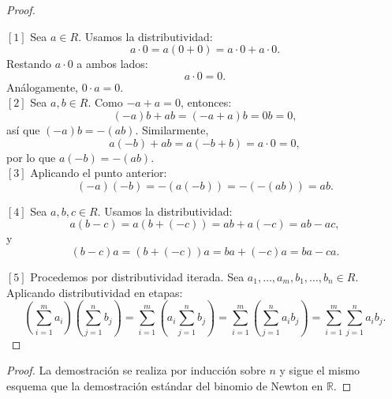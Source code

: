\begin{proof}
	\textcolor{white}{text}
	
	\medskip
	\noindent $[1]$ Sea \( a \in R \). Usamos la distributividad:
	\[
	a \cdot 0 = a(0 + 0) = a \cdot 0 + a \cdot 0.
	\]
	Restando \( a \cdot 0 \) a ambos lados:
	\[
	a \cdot 0 = 0.
	\]
	Análogamente, \( 0 \cdot a = 0 \).\\
	

	\noindent $[2]$ Sea \( a, b \in R \). Como \( -a + a = 0 \), entonces:
	\[
	(-a)b + ab = (-a + a)b = 0b = 0,
	\]
	así que \( (-a)b = -(ab) \). Similarmente,
	\[
	a(-b) + ab = a(-b + b) = a \cdot 0 = 0,
	\]
	por lo que \( a(-b) = -(ab) \). \\
	

	
	\noindent $[3]$ Aplicando el punto anterior:
	\[
	(-a)(-b) = -\left( a(-b) \right) = -\left( -(ab) \right) = ab.
	\]
	
	
	\noindent $[4]$ Sea \( a, b, c \in R \). Usamos la distributividad:
	\[
	a(b - c) = a(b + (-c)) = ab + a(-c) = ab - ac,
	\]
	y
	\[
	(b - c)a = (b + (-c))a = ba + (-c)a = ba - ca.
	\]
	
	
	\noindent $[5]$ Procedemos por distributividad iterada. Sea \( a_1, \dots, a_m, b_1, \dots, b_n \in R \). Aplicando distributividad en etapas:
	\[
	\left( \sum_{i=1}^m a_i \right) \left( \sum_{j=1}^n b_j \right)
	= \sum_{i=1}^m \left( a_i \sum_{j=1}^n b_j \right)= \sum_{i=1}^m \left(  \sum_{j=1}^n a_ib_j \right)
	= \sum_{i=1}^m \sum_{j=1}^n a_i b_j.
	\]
	
\end{proof}

\begin{proposicion}
\end{proposicion}
\begin{proof}
	La demostración se realiza por inducción sobre $n$ y sigue el mismo esquema que la demostración estándar del binomio de Newton en $\mathbb{R}$.
\end{proof}


\begin{definicion}
\end{definicion}

